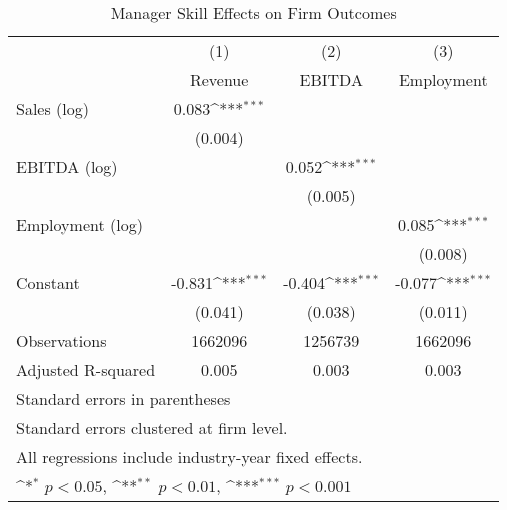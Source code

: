 \begin{table}[htbp]\centering
\def\sym#1{\ifmmode^{#1}\else\(^{#1}\)\fi}
\caption{Manager Skill Effects on Firm Outcomes}
\begin{tabular}{l*{3}{c}}
\toprule
                    &\multicolumn{1}{c}{(1)}&\multicolumn{1}{c}{(2)}&\multicolumn{1}{c}{(3)}\\
                    &\multicolumn{1}{c}{Revenue}&\multicolumn{1}{c}{EBITDA}&\multicolumn{1}{c}{Employment}\\
\midrule
Sales (log)         &       0.083\sym{***}&                     &                     \\
                    &     (0.004)         &                     &                     \\
\addlinespace
EBITDA (log)        &                     &       0.052\sym{***}&                     \\
                    &                     &     (0.005)         &                     \\
\addlinespace
Employment (log)    &                     &                     &       0.085\sym{***}\\
                    &                     &                     &     (0.008)         \\
\addlinespace
Constant            &      -0.831\sym{***}&      -0.404\sym{***}&      -0.077\sym{***}\\
                    &     (0.041)         &     (0.038)         &     (0.011)         \\
\midrule
Observations        &     1662096         &     1256739         &     1662096         \\
Adjusted R-squared  &       0.005         &       0.003         &       0.003         \\
\bottomrule
\multicolumn{4}{l}{\footnotesize Standard errors in parentheses}\\
\multicolumn{4}{l}{\footnotesize Standard errors clustered at firm level.}\\
\multicolumn{4}{l}{\footnotesize All regressions include industry-year fixed effects.}\\
\multicolumn{4}{l}{\footnotesize \sym{*} \(p<0.05\), \sym{**} \(p<0.01\), \sym{***} \(p<0.001\)}\\
\end{tabular}
\end{table}
